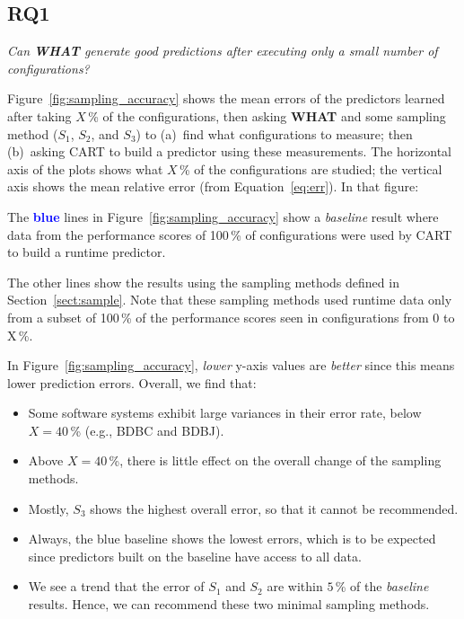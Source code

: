 \documentclass{newsig}
\newcommand{\fig}[1]{Figure~\ref{fig:#1}}
\newcommand{\eq}[1]{Equation~\ref{eq:#1}}
\newcommand{\what}{{\bf WHAT }}
\begin{document}
\subsection{RQ1}

\begin{center}
{\em Can  \what generate good predictions after
executing only a small number of configurations?}
\end{center}

\noindent \fig{sampling_accuracy} shows the mean errors of the predictors learned
after taking $X$\,\% of the configurations, then asking  \what and some sampling method ($S_1$, $S_2$, and $S_3$)
to (a)~find what configurations to measure; then (b)~asking CART to build a predictor
using these measurements. The horizontal axis of the plots shows what $X$\,\%
of the configurations are studied; the vertical axis shows the mean relative error (from \eq{err}).
In that figure:
\begin{compactitem}
\item
The \textcolor{blue}{{\bf blue}} lines in \fig{sampling_accuracy} show a {\em baseline} result
where data from the performance scores of 100\,\% of  configurations were used by CART
to build a runtime predictor.
\item
The other lines show the results using the sampling methods defined in Section~\ref{sect:sample}.
Note that these sampling methods used  runtime data only from a
subset of 100\,\% of the performance scores seen in configurations
from 0 to X\,\%.
\end{compactitem}


In \fig{sampling_accuracy}, {\em lower} y-axis values  are {\em better} since this means lower
prediction errors. Overall, we find that:
\begin{itemize}

\item Some software systems exhibit large variances in their error rate, below $X=40$\,\% (e.g., BDBC and BDBJ).
\item Above $X=40$\,\%, there is little effect on the overall change of the sampling methods.
\item
Mostly, $S_3$ shows the highest overall error, 
so that it cannot be recommended.
\item Always, the   blue baseline shows the lowest errors, which is to be
expected since predictors built on the baseline have access to all data.
\item
We see a trend that the error of  $S_1$ and $S_2$ are within $5$\,\% of the {\em baseline} results.
Hence, we can recommend these two minimal sampling methods.
\end{itemize}
\end{document}
